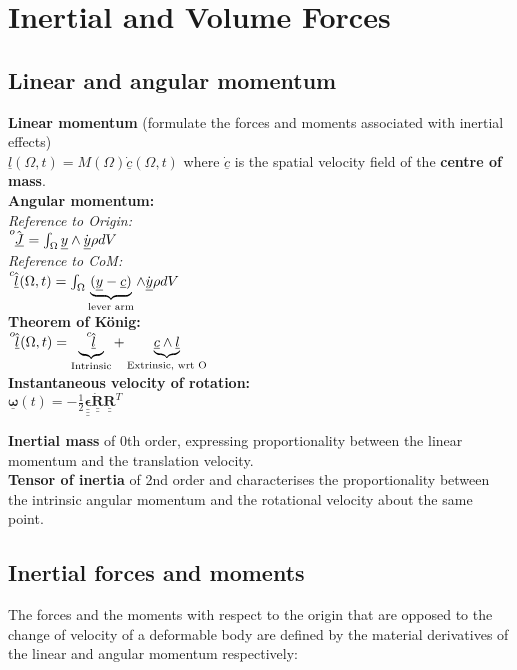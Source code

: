 \section{Inertial and Volume Forces}
\subsection*{Linear and angular momentum}
\smallskip

\textbf{Linear momentum} (formulate the forces and moments associated with inertial effects) \\
$ \underline{l}(\Omega, t) = M(\Omega) \dot{\underline{c}}(\Omega, t) $ \qquad where $\dot{\underline{c}}$ is the spatial velocity field of the \textbf{centre of mass}. \\

\textbf{Angular momentum:} \\
\textit{Reference to Origin:} \\
$ \tensor[^o]{\hat{\underline{J}}}{} = \int_{\Omega} \underline{y} \wedge \dot{\underline{y}} \rho dV $ \\

\textit{Reference to CoM:} \\
$ \tensor[^c]{\hat{\underline{l}}}{} (\Omega, t) = \int_{\Omega} \underbrace{(\underline{y} - \underline{c})}_{\text{lever arm}} \wedge \dot{\underline{y}} \rho dV $ \\

\textbf{Theorem of König:} \\
$ \tensor[^o]{\hat{\underline{l}}}{} (\Omega, t) = \underbrace{\tensor[^c]{\hat{\underline{l}}}{}}_{\text{Intrinsic}} + \underbrace{\underline{c} \wedge \underline{l}}_{\text{Extrinsic, wrt O}} $ \\

\textbf{Instantaneous velocity of rotation:} \\
$\underline{\mathbf{\omega}}(t) = -\frac{1}{2} \underline{\underline{\underline{\mathbf{\epsilon}}}} \underline{\underline{\mathbf{\dot{R}}}} \underline{\underline{\mathbf{R}}}^T$

\textbf{Inertial mass} of 0th order, expressing proportionality between the linear momentum and the translation velocity. \\
\textbf{Tensor of inertia} of 2nd order and characterises the proportionality between the intrinsic angular momentum and the rotational velocity about the same point. \\

\subsection*{Inertial forces and moments}
\smallskip
The forces and the moments with respect to the origin that are opposed to the change of velocity of a deformable body are defined by the material derivatives of the linear and angular momentum respectively: \\

